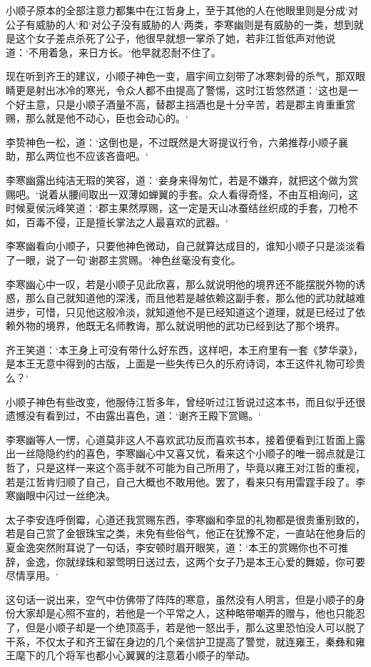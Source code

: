 小顺子原本的全部注意力都集中在江哲身上，至于其他的人在他眼里则是分成‘对公子有威胁的人‘和‘对公子没有威胁的人‘两类，李寒幽则是有威胁的一类，想到就是这个女子差点杀死了公子，他很早就想一掌杀了她，若非江哲低声对他说道：‘不用着急，来日方长。‘他早就忍耐不住了。

现在听到齐王的建议，小顺子神色一变，眉宇间立刻带了冰寒刺骨的杀气，那双眼睛更是射出冰冷的寒光，令众人都不由提高了警惕，这时江哲悠然道：‘这也是一个好主意，只是小顺子酒量不高，替郡主挡酒也是十分辛苦，若是郡主肯重重赏赐，那么就是他不动心，臣也会动心的。‘

李贽神色一松，道：‘这倒也是，不过既然是大哥提议行令，六弟推荐小顺子襄助，那么两位也不应该吝啬吧。‘

李寒幽露出纯洁无瑕的笑容，道：‘妾身来得匆忙，若是不嫌弃，就把这个做为赏赐吧。‘说着从腰间取出一双薄如蝉翼的手套。众人看得奇怪，不由互相询问，这时候夏侯沅峰笑道：‘郡主果然厚赐，这一定是天山冰蚕结丝织成的手套，刀枪不如，百毒不侵，正是擅长掌法之人最喜欢的武器。‘

李寒幽看向小顺子，只要他神色微动，自己就算达成目的，谁知小顺子只是淡淡看了一眼，说了一句‘谢郡主赏赐。‘神色丝毫没有变化。

李寒幽心中一叹，若是小顺子见此欣喜，那么就说明他的境界还不能摆脱外物的诱惑，那么自己就知道他的深浅，而且他若是越依赖这副手套，那么他的武功就越难进步，可惜，只见他这般冷淡，就知道他不是已经知道这个道理，就是已经过了依赖外物的境界，他既无名师教诲，那么就说明他的武功已经到达了那个境界。

齐王笑道：‘本王身上可没有带什么好东西，这样吧，本王府里有一套《梦华录》，是本王无意中得到的古版，上面是一些失传已久的乐府诗词，本王这件礼物可珍贵么？‘

小顺子神色有些改变，他服侍江哲多年，曾经听过江哲说过这本书，而且似乎还很遗憾没有看到过，不由露出喜色，道：‘谢齐王殿下赏赐。‘

李寒幽等人一愣，心道莫非这人不喜欢武功反而喜欢书本，接着便看到江哲面上露出一丝隐隐约约的喜色，李寒幽心中又喜又忧，看来这个小顺子的唯一弱点就是江哲了，只是这样一来这个高手就不可能为自己所用了，毕竟以雍王对江哲的重视，若是江哲肯归顺了自己，自己大概也不敢用他。罢了，看来只有用雷霆手段了。李寒幽眼中闪过一丝绝决。

太子李安连呼倒霉，心道还我赏赐东西，李寒幽和李显的礼物都是很贵重别致的，若是自己赏了金银珠宝之类，未免有些俗气，他正在犹豫不定，一直站在他身后的夏金逸突然附耳说了一句话，李安顿时眉开眼笑，道：‘本王的赏赐你也不可推辞，金逸，你就绿珠和翠莺明日送过去，这两个女子乃是本王心爱的舞姬，你可要尽情享用。‘

这句话一说出来，空气中仿佛带了阵阵的寒意，虽然没有人明言，但是小顺子的身份大家却是心照不宣的，若他是一个平常之人，这种略带嘲弄的赠与，他也只能忍了，但是小顺子却是一个绝顶高手，若是他一怒出手，那么这里恐怕没人可以脱了干系，不仅太子和齐王留在身边的几个亲信护卫提高了警觉，就连雍王，秦彝和雍王麾下的几个将军也都小心翼翼的注意着小顺子的举动。

